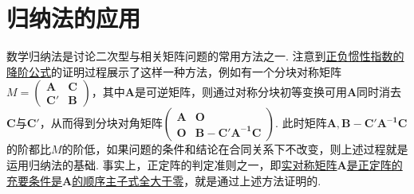 \documentclass[../../main.tex]{subfiles}%
\begin{document}
\section{归纳法的应用}

数学归纳法是讨论二次型与相关矩阵问题的常用方法之一. 注意到\hyperref[proposition:正负惯性指数的降阶公式]{正负惯性指数的降阶公式}的证明过程展示了这样一种方法，例如有一个分块对称矩阵$M = \begin{pmatrix}
\boldsymbol{A} & \boldsymbol{C} \\
\boldsymbol{C}' & \boldsymbol{B}
\end{pmatrix}$，其中$\boldsymbol{A}$是可逆矩阵，则通过对称分块初等变换可用$\boldsymbol{A}$同时消去$\boldsymbol{C}$与$\boldsymbol{C}'$，从而得到分块对角矩阵$\begin{pmatrix}
\boldsymbol{A} & \boldsymbol{O} \\
\boldsymbol{O} & \boldsymbol{B - C'A^{-1}C}
\end{pmatrix}$. 此时矩阵$\boldsymbol{A}, \boldsymbol{B - C'A^{-1}C}$的阶都比$M$的阶低，如果问题的条件和结论在合同关系下不改变，则上述过程就是运用归纳法的基础. 事实上，正定阵的判定准则之一，即\hyperref[theorem:实正定阵的充要条件]{实对称矩阵$\boldsymbol{A}$是正定阵的充要条件是$\boldsymbol{A}$的顺序主子式全大于零}，就是通过上述方法证明的. 
\end{document}

